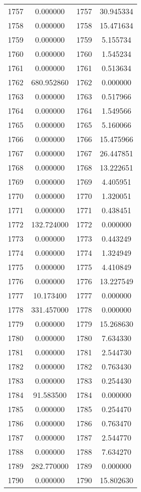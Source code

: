 \documentclass[12pt]{article}
\begin{document}
\begin{longtable}{@{}cccc@{}}
1757 & 0.000000 & 1757 & 30.945334 \\
1758 & 0.000000 & 1758 & 15.471634 \\
1759 & 0.000000 & 1759 & 5.155734 \\
1760 & 0.000000 & 1760 & 1.545234 \\
1761 & 0.000000 & 1761 & 0.513634 \\
1762 & 680.952860 & 1762 & 0.000000 \\
1763 & 0.000000 & 1763 & 0.517966 \\
1764 & 0.000000 & 1764 & 1.549566 \\
1765 & 0.000000 & 1765 & 5.160066 \\
1766 & 0.000000 & 1766 & 15.475966 \\
1767 & 0.000000 & 1767 & 26.447851 \\
1768 & 0.000000 & 1768 & 13.222651 \\
1769 & 0.000000 & 1769 & 4.405951 \\
1770 & 0.000000 & 1770 & 1.320051 \\
1771 & 0.000000 & 1771 & 0.438451 \\
1772 & 132.724000 & 1772 & 0.000000 \\
1773 & 0.000000 & 1773 & 0.443249 \\
1774 & 0.000000 & 1774 & 1.324949 \\
1775 & 0.000000 & 1775 & 4.410849 \\
1776 & 0.000000 & 1776 & 13.227549 \\
1777 & 10.173400 & 1777 & 0.000000 \\
1778 & 331.457000 & 1778 & 0.000000 \\
1779 & 0.000000 & 1779 & 15.268630 \\
1780 & 0.000000 & 1780 & 7.634330 \\
1781 & 0.000000 & 1781 & 2.544730 \\
1782 & 0.000000 & 1782 & 0.763430 \\
1783 & 0.000000 & 1783 & 0.254430 \\
1784 & 91.583500 & 1784 & 0.000000 \\
1785 & 0.000000 & 1785 & 0.254470 \\
1786 & 0.000000 & 1786 & 0.763470 \\
1787 & 0.000000 & 1787 & 2.544770 \\
1788 & 0.000000 & 1788 & 7.634270 \\
1789 & 282.770000 & 1789 & 0.000000 \\
1790 & 0.000000 & 1790 & 15.802630 \\

\end{longtable}
\end{document}
